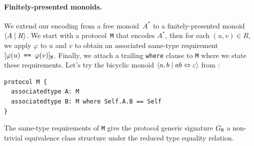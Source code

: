 \documentclass[../generics]{subfiles}
\begin{document}
\paragraph{Finitely-presented monoids.}
We extend our encoding from a free monoid~$A^*$ to a finitely-presented monoid~$\langle A \mid R\rangle$. We start with a protocol~\texttt{M} that encodes $A^*$, then for each $(u,v)\in R$, we apply $\varphi$ to $u$ and $v$ to obtain an associated same-type requirement $[\texttt{$\varphi(u)$ == $\varphi(v)$}]_{\texttt{M}}$. Finally, we attach a trailing \texttt{where} clause to \texttt{M} where we state these requirements. Let's try the bicyclic monoid $\langle a, b \mid ab\Leftrightarrow\varepsilon\rangle$ from :
\begin{Verbatim}
protocol M {
  associatedtype A: M
  associatedtype B: M where Self.A.B == Self
}
\end{Verbatim}

\newcommand{\SameReqPhi}[2]{\SameReq{$\varphi(#1)$}{$\varphi(#2)$}}
\newcommand{\ConfReqPhi}[1]{\ConfReq{$\varphi(#1)$}{M}}

The same-type requirements of \texttt{M} give the protocol generic signature $G_\texttt{M}$ a non-trivial equivalence class structure under the reduced type equality relation.
\end{document}
